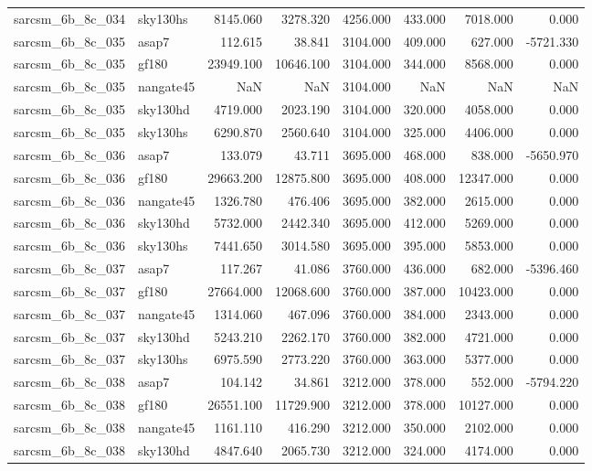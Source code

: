 \begin{tabular}{llrrrrrr}
sarcsm\_6b\_8c\_034 & sky130hs & 8145.060 & 3278.320 & 4256.000 & 433.000 & 7018.000 & 0.000 \\
sarcsm\_6b\_8c\_035 & asap7 & 112.615 & 38.841 & 3104.000 & 409.000 & 627.000 & -5721.330 \\
sarcsm\_6b\_8c\_035 & gf180 & 23949.100 & 10646.100 & 3104.000 & 344.000 & 8568.000 & 0.000 \\
sarcsm\_6b\_8c\_035 & nangate45 & NaN & NaN & 3104.000 & NaN & NaN & NaN \\
sarcsm\_6b\_8c\_035 & sky130hd & 4719.000 & 2023.190 & 3104.000 & 320.000 & 4058.000 & 0.000 \\
sarcsm\_6b\_8c\_035 & sky130hs & 6290.870 & 2560.640 & 3104.000 & 325.000 & 4406.000 & 0.000 \\
sarcsm\_6b\_8c\_036 & asap7 & 133.079 & 43.711 & 3695.000 & 468.000 & 838.000 & -5650.970 \\
sarcsm\_6b\_8c\_036 & gf180 & 29663.200 & 12875.800 & 3695.000 & 408.000 & 12347.000 & 0.000 \\
sarcsm\_6b\_8c\_036 & nangate45 & 1326.780 & 476.406 & 3695.000 & 382.000 & 2615.000 & 0.000 \\
sarcsm\_6b\_8c\_036 & sky130hd & 5732.000 & 2442.340 & 3695.000 & 412.000 & 5269.000 & 0.000 \\
sarcsm\_6b\_8c\_036 & sky130hs & 7441.650 & 3014.580 & 3695.000 & 395.000 & 5853.000 & 0.000 \\
sarcsm\_6b\_8c\_037 & asap7 & 117.267 & 41.086 & 3760.000 & 436.000 & 682.000 & -5396.460 \\
sarcsm\_6b\_8c\_037 & gf180 & 27664.000 & 12068.600 & 3760.000 & 387.000 & 10423.000 & 0.000 \\
sarcsm\_6b\_8c\_037 & nangate45 & 1314.060 & 467.096 & 3760.000 & 384.000 & 2343.000 & 0.000 \\
sarcsm\_6b\_8c\_037 & sky130hd & 5243.210 & 2262.170 & 3760.000 & 382.000 & 4721.000 & 0.000 \\
sarcsm\_6b\_8c\_037 & sky130hs & 6975.590 & 2773.220 & 3760.000 & 363.000 & 5377.000 & 0.000 \\
sarcsm\_6b\_8c\_038 & asap7 & 104.142 & 34.861 & 3212.000 & 378.000 & 552.000 & -5794.220 \\
sarcsm\_6b\_8c\_038 & gf180 & 26551.100 & 11729.900 & 3212.000 & 378.000 & 10127.000 & 0.000 \\
sarcsm\_6b\_8c\_038 & nangate45 & 1161.110 & 416.290 & 3212.000 & 350.000 & 2102.000 & 0.000 \\
sarcsm\_6b\_8c\_038 & sky130hd & 4847.640 & 2065.730 & 3212.000 & 324.000 & 4174.000 & 0.000 \\

\end{tabular}
